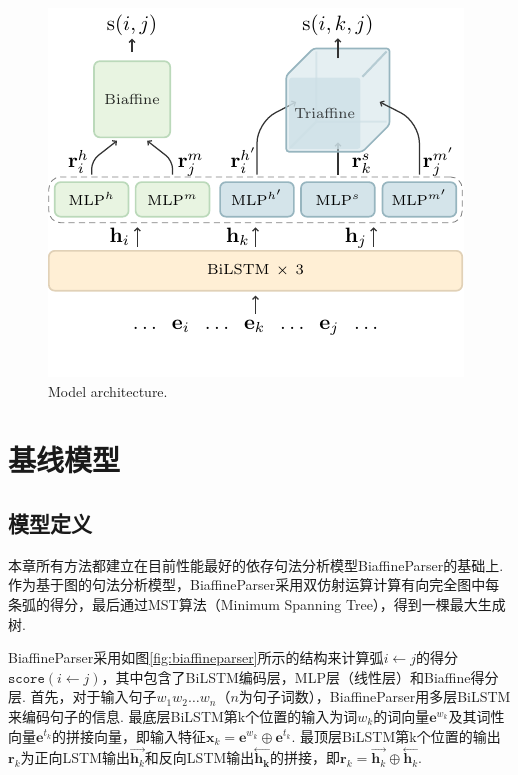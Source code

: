 \begin{figure}[tb]
    \centering
    \includegraphics [scale=0.8] {figures/framework.pdf}
    \caption{Model architecture.
    }
    \label{fig:framework}
\end{figure}

\section{基线模型}

\subsection{模型定义}
本章所有方法都建立在目前性能最好的依存句法分析模型BiaffineParser的基础上.
作为基于图的句法分析模型，BiaffineParser采用双仿射运算计算有向完全图中每条弧的得分，最后通过MST算法（Minimum Spanning Tree），得到一棵最大生成树.

BiaffineParser采用如图\ref{fig:biaffineparser}所示的结构来计算弧$i \leftarrow j$的得分$\texttt{score}\left( i \leftarrow j \right)$，其中包含了BiLSTM编码层，MLP层（线性层）和Biaffine得分层.
首先，对于输入句子$w_1w_2\dots w_n$（$n$为句子词数），BiaffineParser用多层BiLSTM来编码句子的信息.
最底层BiLSTM第k个位置的输入为词$w_k$的词向量$\mathbf{e}^{w_k}$及其词性向量$\mathbf{e}^{t_k}$的拼接向量，即输入特征$\mathbf{x}_k=\mathbf{e}^{w_k} \oplus \mathbf{e}^{t_k}$. %
最顶层BiLSTM第k个位置的输出$\mathbf{r}_k$为正向LSTM输出$\stackrel{\rightarrow}{\mathbf{h}_k}$和反向LSTM输出$\stackrel{\leftarrow}{\mathbf{h_k}}$的拼接，即$\mathbf{r}_k=\stackrel{\rightarrow}{\mathbf{h}_k} \oplus \stackrel{\leftarrow}{\mathbf{h}_k}$.

